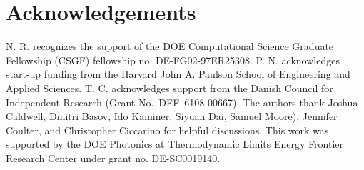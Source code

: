 \documentclass[aps,prb,twocolumn,
groupedaddress,superscriptaddress,
amsfonts,amssymb,amsmath,floatfix,
citeautoscript]{revtex4-1}
\begin{document}
	
	\section{Acknowledgements}
	N. R. recognizes the support of the DOE Computational Science Graduate Fellowship (CSGF) fellowship no. DE-FG02-97ER25308. P. N. acknowledges start-up funding from the Harvard John A. Paulson School of Engineering and Applied Sciences. T. C. acknowledges support from the Danish Council for Independent Research (Grant No.\ DFF--6108-00667). The authors thank Joshua Caldwell, Dmitri Basov, Ido Kaminer, Siyuan Dai, Samuel Moore), Jennifer Coulter, and Christopher Ciccarino for helpful discussions. This work was supported by the DOE Photonics at Thermodynamic Limits Energy Frontier Research Center under grant no. DE-SC0019140.
	
	
	
	
\end{document}
